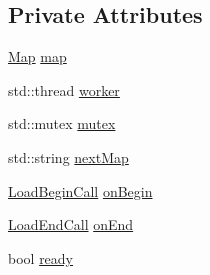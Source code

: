 \subsection*{Private Attributes}
\begin{DoxyCompactItemize}
\item 
\hyperlink{classZeta_1_1Map}{Map} \hyperlink{classZeta_1_1MapLoader_a3caaef11ab483388c87e5f0db9b995fa}{map}
\item 
std\+::thread \hyperlink{classZeta_1_1MapLoader_a73bd9a2d52358d4c8188327505919fa6}{worker}
\item 
std\+::mutex \hyperlink{classZeta_1_1MapLoader_a586211703714fdf5fce629fa25a846ec}{mutex}
\item 
std\+::string \hyperlink{classZeta_1_1MapLoader_a63b8fd33a09d3f7bf26a822ece396195}{next\+Map}
\item 
\hyperlink{classZeta_1_1MapLoader_1_1LoadBeginCall}{Load\+Begin\+Call} \hyperlink{classZeta_1_1MapLoader_a64d774c15fed3fc5ac1e505d2f1b1588}{on\+Begin}
\item 
\hyperlink{classZeta_1_1MapLoader_1_1LoadEndCall}{Load\+End\+Call} \hyperlink{classZeta_1_1MapLoader_a5f9ca0c93a698b67b7cb9dfff3828cc1}{on\+End}
\item 
bool \hyperlink{classZeta_1_1MapLoader_a44233c4f572f8b99aeceb47f7c2300db}{ready}
\end{DoxyCompactItemize}


